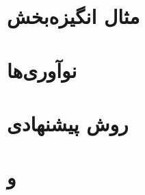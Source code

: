 \section{مثال انگیزه‌بخش}
\label{sec:motivatingExample}


\section{نوآوری‌ها}
\label{sec:contributionCache}


\section{}
\label{sec:systemModelCaching}


\section{روش پیشنهادی}
\label{sec:proposedanaCaching}

\section{ و }
\label{sec:Simulation}



